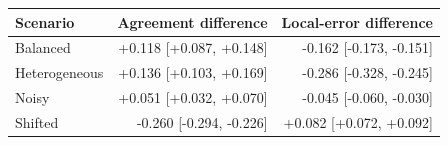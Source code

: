 \begin{tabular}{lrr}
\toprule
Scenario & Agreement difference & Local-error difference \\
\midrule
Balanced & +0.118 [+0.087, +0.148] & -0.162 [-0.173, -0.151] \\
Heterogeneous & +0.136 [+0.103, +0.169] & -0.286 [-0.328, -0.245] \\
Noisy & +0.051 [+0.032, +0.070] & -0.045 [-0.060, -0.030] \\
Shifted & -0.260 [-0.294, -0.226] & +0.082 [+0.072, +0.092] \\
\bottomrule
\end{tabular}
